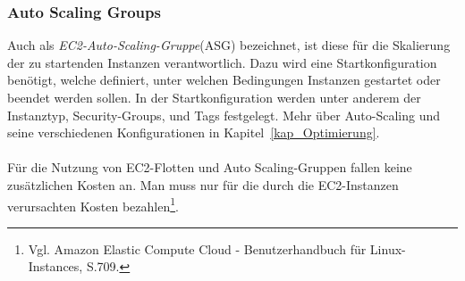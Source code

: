 \subsubsection*{Auto Scaling Groups}%
Auch als \textit{EC2-Auto-Scaling-Gruppe}(ASG) bezeichnet, ist diese für die Skalierung der zu startenden Instanzen verantwortlich. Dazu wird eine Startkonfiguration benötigt, welche definiert, unter welchen Bedingungen Instanzen gestartet oder beendet werden sollen. In der Startkonfiguration werden unter anderem der Instanztyp, Security-Groups, und Tags festgelegt. Mehr über Auto-Scaling und seine verschiedenen Konfigurationen in Kapitel~\ref{kap_Optimierung}.
\\\\
Für die Nutzung von EC2-Flotten und Auto Scaling-Gruppen fallen keine zusätzlichen Kosten an. Man muss nur für die durch die EC2-Instanzen verursachten Kosten bezahlen\footnote{Vgl. Amazon Elastic Compute Cloud - Benutzerhandbuch für Linux-Instances, S.709\cite{AMZ26}. }. 

